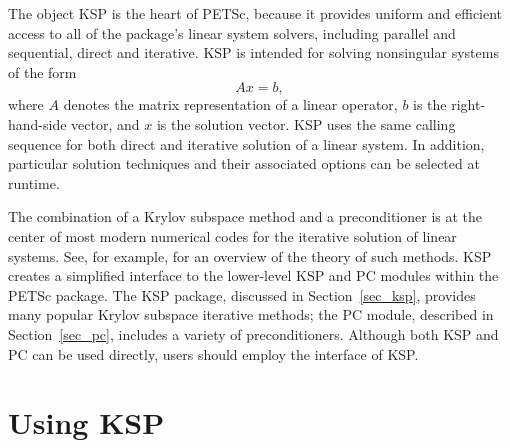 The object KSP is the heart of PETSc, because it provides uniform and efficient access
to all of the package's linear system solvers, including parallel and sequential,
direct and iterative.
KSP is intended for solving nonsingular systems of the form
\begin{equation}
   A x = b,
\label{eq_Ax=b}
\end{equation}
where $ A$ denotes the matrix representation of a linear operator, $b$
is the right-hand-side vector, and $ x $ is the solution vector.  KSP
uses the same calling sequence for both direct and iterative solution
of a linear system.  In addition, particular solution techniques and
their associated options can be selected at runtime.

The combination of a Krylov subspace method and a preconditioner is at
the center of most modern numerical codes for the iterative solution of
linear systems.  See, for example, \cite{fgn} for an overview of the theory
of such methods.  KSP creates a simplified interface to the
lower-level KSP and PC modules within the PETSc package.  The KSP package,
discussed in
Section~\ref{sec_ksp}, provides many popular Krylov
 subspace iterative methods;
the PC module, described in Section~\ref{sec_pc}, includes a
variety of preconditioners.  Although both  KSP and PC can be used
directly, users should employ the interface of KSP.

\section{Using KSP}
\label{sec_usingsles}


